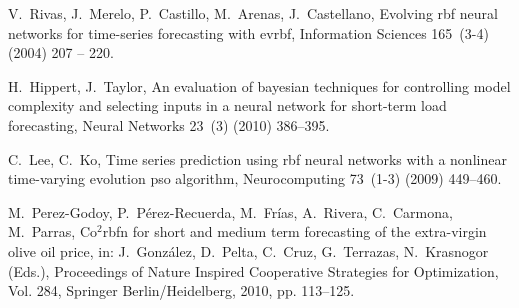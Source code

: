 \documentclass[runningheads]{llncs}
\begin{document}
\begin{thebibliography}{x}
V.~Rivas, J.~Merelo, P.~Castillo, M.~Arenas, J.~Castellano, Evolving rbf neural
  networks for time-series forecasting with evrbf, Information Sciences
  165~(3-4) (2004) 207 -- 220.








H.~Hippert, J.~Taylor, An evaluation of bayesian techniques for controlling
  model complexity and selecting inputs in a neural network for short-term load
  forecasting, Neural Networks 23~(3) (2010) 386--395.

C.~Lee, C.~Ko, Time series prediction using rbf neural networks with a
  nonlinear time-varying evolution pso algorithm, Neurocomputing 73~(1-3)
  (2009) 449--460.

M.~Perez-Godoy, P.~P\'erez-Recuerda, M.~Fr\'{i}as, A.~Rivera, C.~Carmona,
  M.~Parras, Co$^2$rbfn for short and medium term forecasting of the
  extra-virgin olive oil price, in: J.~Gonz\'alez, D.~Pelta, C.~Cruz,
  G.~Terrazas, N.~Krasnogor (Eds.), Proceedings of Nature Inspired Cooperative
  Strategies for Optimization, Vol. 284, Springer Berlin/Heidelberg, 2010, pp.
  113--125.


\end{thebibliography}
\end{document}
